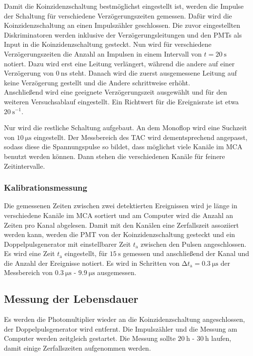            \noindent Damit die Koinzidenzschaltung bestmöglichst eingestellt ist, werden die Impulse der Schaltung für verschiedene Verzögerungszeiten gemessen. Dafür wird die Koinzidenzschaltung 
            an einen Impulszähler geschlossen. Die zuvor eingestellten Diskriminatoren werden inklusive der Verzögerungsleitungen und den PMTs als Input in die Koinzidenzschaltung gesteckt. 
            Nun wird für verschiedene Verzögerungszeiten die Anzahl an Impulsen in einem Intervall von $t = \SI{20}{\second}$ notiert. Dazu wird erst eine Leitung verlängert, während die andere auf 
            einer Verzögerung von $\SI{0}{\nano\second}$ steht. Danach wird die zuerst ausgemessene Leitung auf keine Verzögerung gestellt und die Andere schrittweise erhöht. \\ 
            Anschließend wird eine geeignete Verzögerungszeit ausgewählt und für den weiteren Versuchsablauf eingestellt. Ein Richtwert für die Ereignisrate ist etwa $\SI{20}{\second\tothe{-1}}$.
            
    \noindent Nur wird die restliche Schaltung aufgebaut. An dem Monoflop wird eine Suchzeit von $\SI{10}{\micro\second}$ eingestellt. Der Messbereich des TAC wird dementsprechend angepasst, 
    sodass diese die Spannungspulse so bildet, dass möglichst viele Kanäle im MCA benutzt werden können. Dann stehen die verschiedenen Kanäle für feinere Zeitintervalle. 

        \subsubsection{Kalibrationsmessung}

            \noindent Die gemessenen Zeiten zwischen zwei detektierten Ereignissen wird je länge in verschiedene Kanäle im MCA sortiert und am Computer wird die Anzahl an Zeiten pro 
            Kanal abgelesen. Damit mit den Kanälen eine Zerfallszeit assoziiert werden kann, werden die PMT von der Koinzidenzschaltung gesteckt und ein Doppelpulsgenerator mit 
            einstellbarer Zeit $t_\text{a}$ zwischen den Pulsen angeschlossen. \\ 
            Es wird eine Zeit $t_\text{a}$ eingestellt, für $\SI{15}{\second}$ gemessen und anschließend der Kanal und die Anzahl der Ereignisse notiert. Es wird in Schritten von 
            $\increment t_\text{a} = \SI{0.3}{\micro\second}$ der Messbereich von $\SI{0.3}{\micro\second}$ - $\SI{9.9}{\micro\second}$ ausgemessen. 
            

    \subsection{Messung der Lebensdauer}

    \noindent Es werden die Photomultiplier wieder an die Koinzidenzschaltung angeschlossen, der Doppelpulsgenerator wird entfernt. Die Impulszähler und die Messung am Computer 
    werden zeitgleich gestartet. Die Messung sollte $\SI{20}{\hour}$ - $\SI{30}{\hour}$ laufen, damit einige Zerfallszeiten aufgenommen werden. 